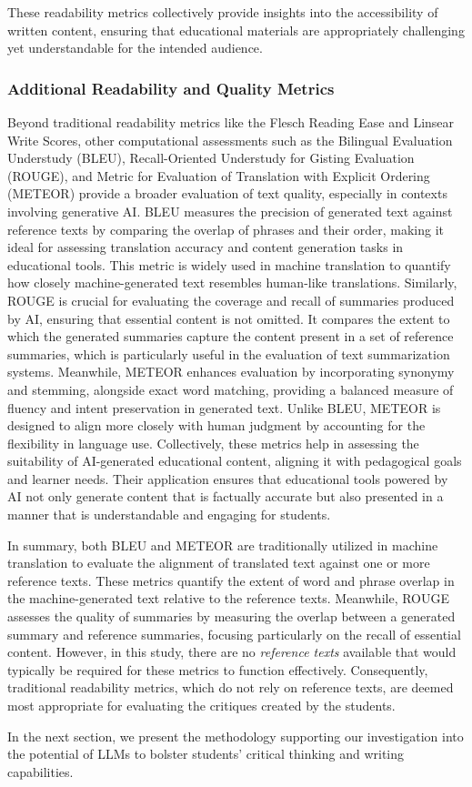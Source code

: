 These readability metrics collectively provide insights into the accessibility of written content, ensuring that educational materials are appropriately challenging yet understandable for the intended audience.

\subsubsection{Additional Readability and Quality Metrics}
Beyond traditional readability metrics like the Flesch Reading Ease and Linsear Write Scores, other computational assessments such as the Bilingual Evaluation Understudy (BLEU), Recall-Oriented Understudy for Gisting Evaluation (ROUGE), and Metric for Evaluation of Translation with Explicit Ordering (METEOR) provide a broader evaluation of text quality, especially in contexts involving generative AI. BLEU measures the precision of generated text against reference texts by comparing the overlap of phrases and their order, making it ideal for assessing translation accuracy and content generation tasks in educational tools. This metric is widely used in machine translation to quantify how closely machine-generated text resembles human-like translations. Similarly, ROUGE is crucial for evaluating the coverage and recall of summaries produced by AI, ensuring that essential content is not omitted. It compares the extent to which the generated summaries capture the content present in a set of reference summaries, which is particularly useful in the evaluation of text summarization systems. Meanwhile, METEOR enhances evaluation by incorporating synonymy and stemming, alongside exact word matching, providing a balanced measure of fluency and intent preservation in generated text. Unlike BLEU, METEOR is designed to align more closely with human judgment by accounting for the flexibility in language use. Collectively, these metrics help in assessing the suitability of AI-generated educational content, aligning it with pedagogical goals and learner needs. Their application ensures that educational tools powered by AI not only generate content that is factually accurate but also presented in a manner that is understandable and engaging for students.

In summary, both BLEU and METEOR are traditionally utilized in machine translation to evaluate the alignment of translated text against one or more reference texts. These metrics quantify the extent of word and phrase overlap in the machine-generated text relative to the reference texts. Meanwhile, ROUGE assesses the quality of summaries by measuring the overlap between a generated summary and reference summaries, focusing particularly on the recall of essential content. However, in this study, there are no \textit{reference texts} available that would typically be required for these metrics to function effectively. Consequently, traditional readability metrics, which do not rely on reference texts, are deemed most appropriate for evaluating the critiques created by the students.

In the next section, we present the methodology supporting our investigation into the potential of LLMs to bolster students' critical thinking and writing capabilities.